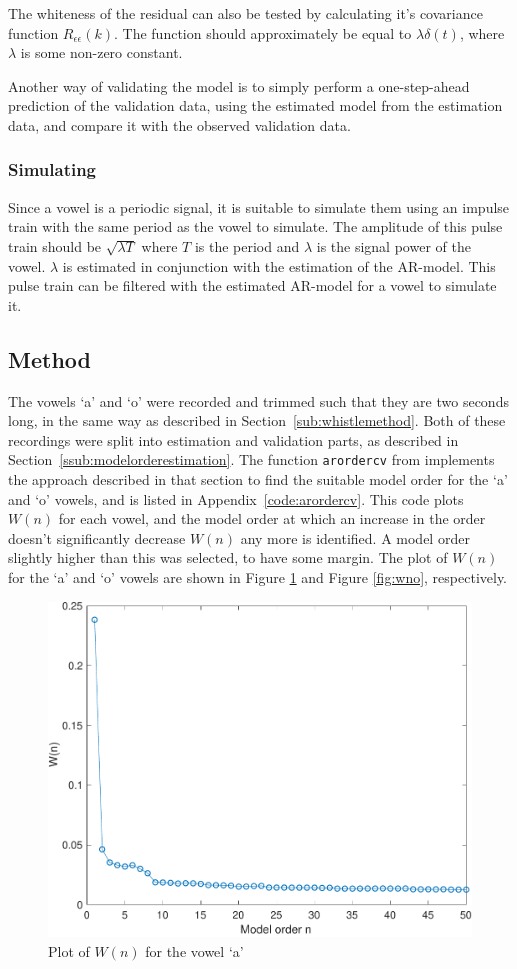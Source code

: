 \documentclass{IEEEtran}
\newcommand{\code}[1]{\texttt{#1}}
\begin{document}
The whiteness of the residual can also be tested by calculating it's covariance
function $R_{\epsilon\epsilon}(k)$. The function should approximately be equal
to $\lambda\delta(t)$, where $\lambda$ is some non-zero constant.

Another way of validating the model is to simply perform a one-step-ahead
prediction of the validation data, using the estimated model from the
estimation data, and compare it with the observed validation data.

\subsubsection{Simulating}
Since a vowel is a periodic signal, it is suitable to simulate them using an
impulse train with the same period as the vowel to simulate. The amplitude
of this pulse train should be $\sqrt{\lambda T}$ where $T$ is the period and
$\lambda$ is the signal power of the vowel. $\lambda$ is estimated in conjunction with the
estimation of the AR-model.
This pulse train can be filtered with the estimated AR-model for a vowel
to simulate it.

\subsection{Method}
The vowels `a' and `o' were recorded and trimmed such that they are two seconds
long, in the same way as described in Section~\ref{sub:whistlemethod}.
Both of these recordings were split into estimation and validation parts,
as described in Section~\ref{ssub:modelorderestimation}. The function
\code{arordercv} from \cite{signalproc} implements the approach described in
that section to find the suitable model order for the `a' and `o' vowels, and is
listed in Appendix~\ref{code:arordercv}. This code plots $W(n)$ for each
vowel, and the model order at which an increase in the order doesn't
significantly decrease $W(n)$ any more is identified. A model order slightly
higher than this was selected, to have some margin. The plot of $W(n)$ for the
`a' and `o' vowels are shown in Figure \ref{fig:wna} and Figure \ref{fig:wno},
respectively.

\begin{figure}[h!]
    \centering
    \captionsetup{justification=centering}
    \includegraphics[width=0.8\columnwidth]{pictures/wna.pdf}
    \caption{Plot of $W(n)$ for the vowel `a'}
    \label{fig:wna}
\end{figure}
\end{document}

